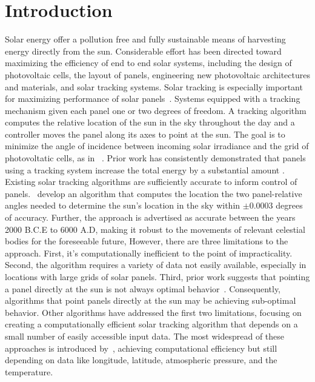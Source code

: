 \documentclass[11pt]{article}
\begin{document}
\section{Introduction}
Solar energy offer a pollution free and fully sustainable means of harvesting energy directly from the sun. Considerable effort has been directed toward maximizing the efficiency of end to end solar systems, including the design of photovoltaic cells, the layout of panels, engineering new photovoltaic architectures and materials, and solar tracking systems. Solar tracking is especially important for maximizing performance of solar panels~\cite{Eke2012,Rizk2008,King2001}. Systems equipped with a tracking mechanism given each panel one or two degrees of freedom. A tracking algorithm computes the relative location of the sun in the sky throughout the day and a controller moves the panel along its axes to point at the sun. The goal is to minimize the angle of incidence between incoming solar irradiance and the grid of photovoltatic cells, as in ~\citet{Eke2012,Benghanem2011,King2001, kalogirou1996design}. Prior work has consistently demonstrated that panels using a tracking system increase the total energy by a substantial amount . \\

Existing solar tracking algorithms are sufficiently accurate to inform control of panels.~\citet{reda2004solar} develop an algorithm that computes the location the two panel-relative angles needed to determine the sun's location in the sky within $\pm 0.0003$ degrees of accuracy. Further, the approach is advertised as accurate between the years 2000 B.C.E to 6000 A.D, making it robust to the movements of relevant celestial bodies for the foreseeable future, However, there are three limitations to the approach. First, it's computationally inefficient to the point of impracticality. Second, the algorithm requires a variety of data not easily available, especially in locations with large grids of solar panels. Third, prior work suggests that pointing a panel directly at the sun is not always optimal behavior~\citet{Kelly2009,Hussein1995,King2001}. Consequently, algorithms that point panels directly at the sun may be achieving sub-optimal behavior. Other algorithms have addressed the first two limitations, focusing on creating a computationally efficient solar tracking algorithm that depends on a small number of easily accessible input data. The most widespread of these approaches is introduced by~\citet{Grena2008}, achieving computational efficiency but still depending on data like longitude, latitude, atmospheric pressure, and the temperature. \\ 
\end{document}
